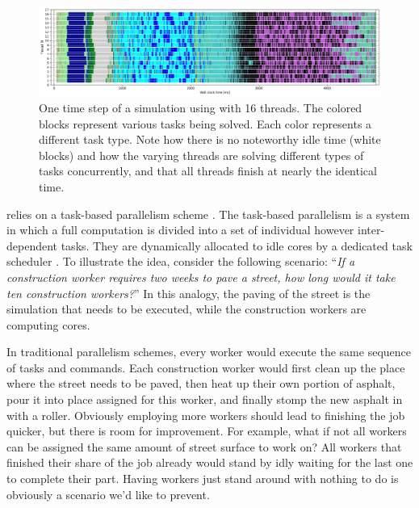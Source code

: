 \begin{figure}
 \centering
 \includegraphics[width=\textwidth]{figures/Meshless/taskplot.png}%
 \caption{
One time step of a simulation using \swift with 16 threads. The colored blocks represent various
tasks being solved. Each color represents a different task type. Note how there is no noteworthy
idle time (white blocks) and how the varying threads are solving different types of tasks
concurrently, and that all threads finish at nearly the identical time.
 }
 \label{fig:taskplot}
\end{figure}

\swift relies on a task-based parallelism scheme
\citep{gonnetSWIFTFastAlgorithms2013, gonnetQuickSchedTaskbasedParallelism2016b,
theunsSWIFTTaskbasedHydrodynamics2015}.
The task-based parallelism is a system in which a full computation is divided into a set of
individual however inter-dependent tasks. They are dynamically allocated to idle cores by a
dedicated task scheduler \citep{gonnetQuickSchedTaskbasedParallelism2016b}.
To illustrate the idea, consider the following scenario: ``\textit{If a construction worker requires
two weeks to pave a street, how long would it take ten construction workers?}'' In this analogy, the
paving of the street is the simulation that needs to be executed, while the construction workers are
computing cores.

In traditional parallelism schemes, every worker would execute the same sequence of tasks and
commands. Each construction worker would first clean up the place where the street needs to be
paved, then heat up their own portion of asphalt, pour it into place assigned for this worker, and
finally stomp the new asphalt in with a roller. Obviously employing more workers should lead to
finishing the job quicker, but there is room for improvement. For example, what if not all workers
can be assigned the same amount of street surface to work on? All workers that finished their share
of the job already would stand by idly waiting for the last one to complete their part. Having
workers just stand around with nothing to do is obviously a scenario we'd like to prevent.


